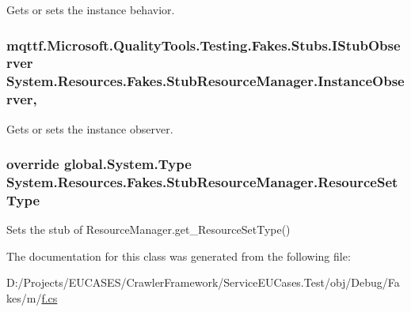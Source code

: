 Gets or sets the instance behavior.

\hypertarget{class_system_1_1_resources_1_1_fakes_1_1_stub_resource_manager_a15e93bce0dc0be2e9d55c00965d13778}{
\subsubsection[{Instance\-Observer}]{\setlength{\rightskip}{0pt plus 5cm}mqttf.\-Microsoft.\-Quality\-Tools.\-Testing.\-Fakes.\-Stubs.\-I\-Stub\-Observer System.\-Resources.\-Fakes.\-Stub\-Resource\-Manager.\-Instance\-Observer\hspace{0.3cm}{\ttfamily [get]}, {\ttfamily [set]}}}\label{class_system_1_1_resources_1_1_fakes_1_1_stub_resource_manager_a15e93bce0dc0be2e9d55c00965d13778}


Gets or sets the instance observer.

\hypertarget{class_system_1_1_resources_1_1_fakes_1_1_stub_resource_manager_a0849618e3bf4d2e72f8eb1e48eaa3871}{
\subsubsection[{Resource\-Set\-Type}]{\setlength{\rightskip}{0pt plus 5cm}override global.\-System.\-Type System.\-Resources.\-Fakes.\-Stub\-Resource\-Manager.\-Resource\-Set\-Type\hspace{0.3cm}{\ttfamily [get]}}}\label{class_system_1_1_resources_1_1_fakes_1_1_stub_resource_manager_a0849618e3bf4d2e72f8eb1e48eaa3871}


Sets the stub of Resource\-Manager.\-get\-\_\-\-Resource\-Set\-Type()



The documentation for this class was generated from the following file\-:\begin{DoxyCompactItemize}
\item 
D\-:/\-Projects/\-E\-U\-C\-A\-S\-E\-S/\-Crawler\-Framework/\-Service\-E\-U\-Cases.\-Test/obj/\-Debug/\-Fakes/m/\hyperlink{m_2f_8cs}{f.\-cs}\end{DoxyCompactItemize}
